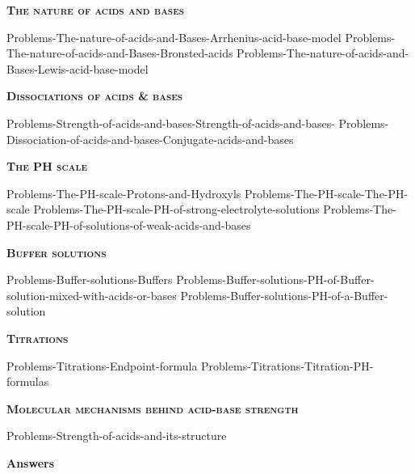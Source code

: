 \documentclass[main.tex]{subfiles}
\begin{document}
\newpage
 
\fancyhfoffset[E,O]{0pt}
\setlength{\columnsep}{30pt}
\begin{conclusion}
\end{conclusion}
\begin{multicols*}{2}\setcounter{numA}{1}
{\raggedright\textsc{\textbf{The nature of acids and bases}}\par}
 {Problems-The-nature-of-acids-and-Bases-Arrhenius-acid-base-model}
 {Problems-The-nature-of-acids-and-Bases-Bronsted-acids}
 {Problems-The-nature-of-acids-and-Bases-Lewis-acid-base-model}
{\raggedright\textsc{\textbf{Dissociations of acids \& bases}}\par}
 {Problems-Strength-of-acids-and-bases-Strength-of-acids-and-bases-}
 {Problems-Dissociation-of-acids-and-bases-Conjugate-acids-and-bases}
 
{\raggedright\textsc{\textbf{The PH scale}}\par}
 {Problems-The-PH-scale-Protons-and-Hydroxyls}
 {Problems-The-PH-scale-The-PH-scale}
 {Problems-The-PH-scale-PH-of-strong-electrolyte-solutions}
 {Problems-The-PH-scale-PH-of-solutions-of-weak-acids-and-bases}
			
{\raggedright\textsc{\textbf{Buffer solutions}}\par}
 {Problems-Buffer-solutions-Buffers}
 {Problems-Buffer-solutions-PH-of-Buffer-solution-mixed-with-acids-or-bases}
 {Problems-Buffer-solutions-PH-of-a-Buffer-solution}
{\raggedright\textsc{\textbf{Titrations}}\par}
 {Problems-Titrations-Endpoint-formula}
 {Problems-Titrations-Titration-PH-formulas}
 {\raggedright\textsc{\textbf{Molecular mechanisms behind acid-base strength}}\par}
 {Problems-Strength-of-acids-and-its-structure}

\end{multicols*}
\newpage
\begin{answersenvironment}
\begin{minipage}[c]{1\textwidth}
\begin{localsize}{10}
{\Large \bf Answers}
  \printsolutions[byID={1,3,5,7,9,11,13,15,17,19,21,23,25,27,29,31,33,35,37, 39}]
\end{localsize}
\end{minipage}\end{answersenvironment}
\end{document}
